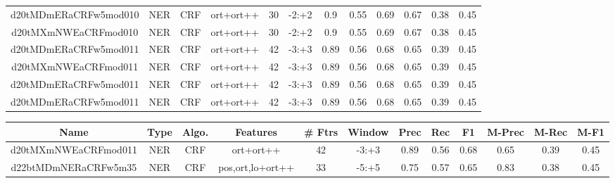 \documentclass[a4paper]{article}
\begin{document}
\begin{landscape}
\begin{center}
\begin{tabular}{ |c|c|c|c|c|c|c|c|c|c|c|c|}
 
 	
 	\small{ d20tMDmERaCRFw5mod010 } & \small{ NER} & \small{  CRF }  & ort+ort++  &  30 &  \small{  -2:+2 }  &  0.9 & 0.55 & 0.69  &  0.67 & 0.38 & 0.45 \\
 	

 
 	
 	\small{ d20tMXmNWEaCRFmod010 } & \small{ NER} & \small{  CRF }  & ort+ort++  &  30 &  \small{  -2:+2 }  &  0.9 & 0.55 & 0.69  &  0.67 & 0.38 & 0.45 \\
 	

 
 	
 	\small{ d20tMDmERaCRFw5mod011 } & \small{ NER} & \small{  CRF }  & ort+ort++  &  42 &  \small{  -3:+3 }  &  0.89 & 0.56 & 0.68  &  0.65 & 0.39 & 0.45 \\
 	

 
 	
 	\small{ d20tMXmNWEaCRFmod011 } & \small{ NER} & \small{  CRF }  & ort+ort++  &  42 &  \small{  -3:+3 }  &  0.89 & 0.56 & 0.68  &  0.65 & 0.39 & 0.45 \\
 	

 
 	
 	\small{ d20tMDmERaCRFw5mod011 } & \small{ NER} & \small{  CRF }  & ort+ort++  &  42 &  \small{  -3:+3 }  &  0.89 & 0.56 & 0.68  &  0.65 & 0.39 & 0.45 \\
 	

 
 	
 	\small{ d20tMDmERaCRFw5mod011 } & \small{ NER} & \small{  CRF }  & ort+ort++  &  42 &  \small{  -3:+3 }  &  0.89 & 0.56 & 0.68  &  0.65 & 0.39 & 0.45 \\
 	
 \hline
\end{tabular}
\end{center}




\begin{center}
\begin{tabular}{ |c|c|c|c|c|c|c|c|c|c|c|c|} 
 \hline
 	Name & Type & Algo. & Features & \# Ftrs & Window & Prec & Rec & F1 & M-Prec & M-Rec & M-F1\\
 \hline

 	

 
 	
 	\small{ d20tMXmNWEaCRFmod011 } & \small{ NER} & \small{  CRF }  & ort+ort++  &  42 &  \small{  -3:+3 }  &  0.89 & 0.56 & 0.68  &  0.65 & 0.39 & 0.45 \\
 	

 
 	
 	\small{ d22btMDmNERaCRFw5m35 } & \small{ NER} & \small{  CRF }  & pos,ort,lo+ort++  &  33 &  \small{  -5:+5 }  &  0.75 & 0.57 & 0.65  &  0.83 & 0.38 & 0.45 \\
 	


\end{tabular}
\end{center}
\end{landscape}
\end{document}
